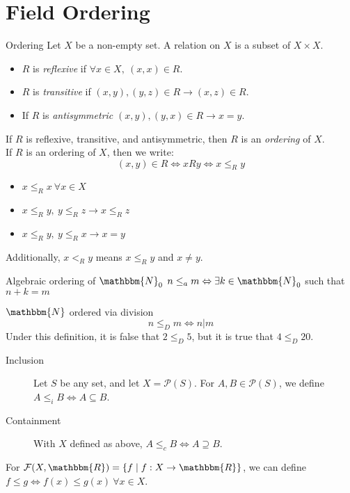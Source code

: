 \documentclass[10pt]{extarticle}
\newcommand{\N}{\mathbbm{N}}
\newcommand{\R}{\mathbbm{R}}
\begin{document}
  \section*{Field Ordering}%
  \begin{problem}{Ordering}
    Let $X$ be a non-empty set. A relation on $X$ is a subset of $X\times X$.
    \begin{itemize}
      \item $R$ is \textsl{reflexive} if $\forall x\in X,~(x,x)\in R$.
      \item $R$ is \textsl{transitive} if $(x,y),(y,z)\in R \rightarrow (x,z)\in R$.
      \item If $R$ is \textsl{antisymmetric} $(x,y),(y,x)\in R\rightarrow x=y$. 
    \end{itemize}
    If $R$ is reflexive, transitive, and antisymmetric, then $R$ is an \textsl{ordering} of $X$.\\

    If $R$ is an ordering of $X$, then we write:
    \[
      (x,y)\in R \Leftrightarrow xRy \Leftrightarrow x\leq_{R} y
    \] 
    \begin{itemize}
      \item $x\leq_{R}x~\forall x\in X$
      \item $x\leq_R y,~y\leq_R z \rightarrow x\leq_R z$
      \item $x\leq_R y,~y\leq_R x \rightarrow x=y$
    \end{itemize}
    Additionally, $x<_R y$ means $x\leq_R y$ and $x\neq y$.
    \begin{problem}{Algebraic ordering of $\N_0$}
      $n\leq_a m\Leftrightarrow \exists k\in \N_0$ such that $n+k = m$
    \end{problem}
    \begin{problem}{$\N$ ordered via division}
      $$n\leq_D m \Leftrightarrow n|m$$
      Under this definition, it is false that $2\leq_D 5$, but it is true that $4\leq_D 20$.
    \end{problem}
    \begin{description}
      \item[Inclusion] Let $S$ be any set, and let $X = \mathcal{P}(S)$. For $A,B\in \mathcal{P}(S)$, we define $A\leq_i B \Leftrightarrow A\subseteq B$.
      \item[Containment] With $X$ defined as above, $A\leq_c B\Leftrightarrow A\supseteq B$.
    \end{description}
    For $\mathcal{F}(X,\R) = \{f\mid f:X\rightarrow\R\}$, we can define $f\leq g\Leftrightarrow f(x)\leq g(x)~\forall x\in X$.
  \end{problem}
\end{document}
